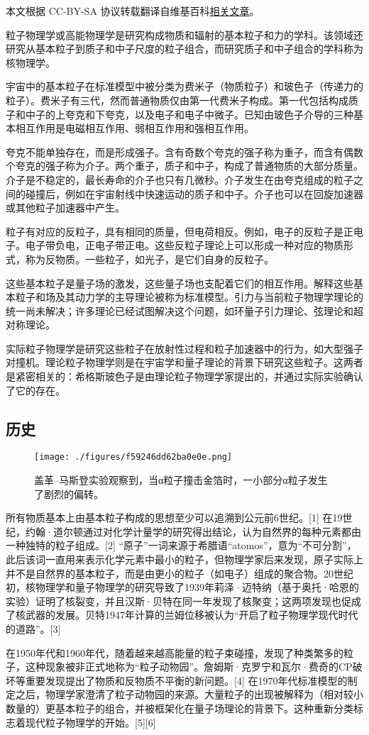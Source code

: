
本文根据 CC-BY-SA 协议转载翻译自维基百科\href{https://en.wikipedia.org/wiki/Particle_physics}{相关文章}。

粒子物理学或高能物理学是研究构成物质和辐射的基本粒子和力的学科。该领域还研究从基本粒子到质子和中子尺度的粒子组合，而研究质子和中子组合的学科称为核物理学。

宇宙中的基本粒子在标准模型中被分类为费米子（物质粒子）和玻色子（传递力的粒子）。费米子有三代，然而普通物质仅由第一代费米子构成。第一代包括构成质子和中子的上夸克和下夸克，以及电子和电子中微子。已知由玻色子介导的三种基本相互作用是电磁相互作用、弱相互作用和强相互作用。

夸克不能单独存在，而是形成强子。含有奇数个夸克的强子称为重子，而含有偶数个夸克的强子称为介子。两个重子，质子和中子，构成了普通物质的大部分质量。介子是不稳定的，最长寿命的介子也只有几微秒。介子发生在由夸克组成的粒子之间的碰撞后，例如在宇宙射线中快速运动的质子和中子。介子也可以在回旋加速器或其他粒子加速器中产生。

粒子有对应的反粒子，具有相同的质量，但电荷相反。例如，电子的反粒子是正电子。电子带负电，正电子带正电。这些反粒子理论上可以形成一种对应的物质形式，称为反物质。一些粒子，如光子，是它们自身的反粒子。

这些基本粒子是量子场的激发，这些量子场也支配着它们的相互作用。解释这些基本粒子和场及其动力学的主导理论被称为标准模型。引力与当前粒子物理学理论的统一尚未解决；许多理论已经试图解决这个问题，如环量子引力理论、弦理论和超对称理论。

实际粒子物理学是研究这些粒子在放射性过程和粒子加速器中的行为，如大型强子对撞机。理论粒子物理学则是在宇宙学和量子理论的背景下研究这些粒子。这两者是紧密相关的：希格斯玻色子是由理论粒子物理学家提出的，并通过实际实验确认了它的存在。
\subsection{历史}
\begin{figure}[ht]
\centering
\texttt{[image: ./figures/f59246dd62ba0e0e.png]}
\caption{盖革–马斯登实验观察到，当α粒子撞击金箔时，一小部分α粒子发生了剧烈的偏转。} \label{fig_Partic_1}
\end{figure}
所有物质基本上由基本粒子构成的思想至少可以追溯到公元前6世纪。[1] 在19世纪，约翰·道尔顿通过对化学计量学的研究得出结论，认为自然界的每种元素都由一种独特的粒子组成。[2] “原子”一词来源于希腊语“atomos”，意为“不可分割”，此后该词一直用来表示化学元素中最小的粒子，但物理学家后来发现，原子实际上并不是自然界的基本粒子，而是由更小的粒子（如电子）组成的聚合物。20世纪初，核物理学和量子物理学的研究导致了1939年莉泽·迈特纳（基于奥托·哈恩的实验）证明了核裂变，并且汉斯·贝特在同一年发现了核聚变；这两项发现也促成了核武器的发展。贝特1947年计算的兰姆位移被认为“开启了粒子物理学现代时代的道路”。[3]

在1950年代和1960年代，随着越来越高能量的粒子束碰撞，发现了种类繁多的粒子，这种现象被非正式地称为“粒子动物园”。詹姆斯·克罗宁和瓦尔·费奇的CP破坏等重要发现提出了物质和反物质不平衡的新问题。[4] 在1970年代标准模型的制定之后，物理学家澄清了粒子动物园的来源。大量粒子的出现被解释为（相对较小数量的）更基本粒子的组合，并被框架化在量子场理论的背景下。这种重新分类标志着现代粒子物理学的开始。[5][6]
